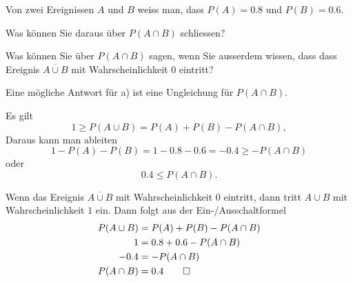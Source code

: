 Von zwei Ereignissen $A$ und $B$ weiss man, dass $P(A)=0.8$ und $P(B)=0.6$.
\begin{teilaufgaben}
\item
Was können Sie daraus über $P(A\cap B)$ schliessen?
\item
Was können Sie über $P(A\cap B)$ sagen, wenn Sie ausserdem wissen, dass 
dass Ereignis $\overline{A\cup B}$ mit Wahrscheinlichkeit $0$ eintritt?
\end{teilaufgaben}


\begin{hinweis}
Eine mögliche Antwort für a) ist eine Ungleichung für $P(A\cap B)$.
\end{hinweis}

\begin{loesung}
\begin{teilaufgaben}
\item 
Es gilt
\[
1\ge P(A\cup B)=P(A)+P(B)-P(A\cap B),
\]
Daraus kann man ableiten
\[
1-P(A)-P(B)=1-0.8-0.6=-0.4 \ge -P(A\cap B)
\]
oder
\[
0.4\le P(A\cap B).
\]
\item 
Wenn das Ereignis $\overline{A\cup B}$ mit Wahrscheinlichkeit $0$ eintritt,
dann tritt $A\cup B$ mit Wahrscheinlichkeit $1$ ein.
Dann folgt aus der Ein-/Ausschaltformel
\begin{align*}
P(A\cup B)&=P(A)+P(B)-P(A\cap B)\\
1&=0.8+0.6-P(A\cap B)\\
-0.4&=-P(A\cap B)\\
P(A\cap B)&=0.4
\qedhere
\end{align*}
\end{teilaufgaben}
\end{loesung}

